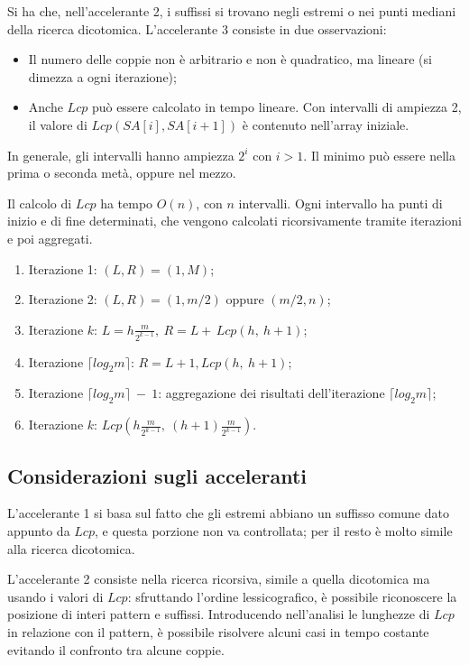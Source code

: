 Si ha che, nell'accelerante 2, i suffissi si trovano negli estremi o nei punti mediani della ricerca dicotomica. L'accelerante 3 consiste in due osservazioni:
\begin{itemize}
	\item Il numero delle coppie non è arbitrario e non è quadratico, ma lineare (si dimezza a ogni iterazione);
	 \item Anche $Lcp$ può essere calcolato in tempo lineare. Con intervalli di ampiezza 2, il valore di $Lcp(SA[i], SA[i+1])$ è contenuto nell'array iniziale.
\end{itemize}
In generale, gli intervalli hanno ampiezza $2^i$ con $i > 1$. Il minimo può essere nella prima o seconda metà, oppure nel mezzo.

Il calcolo di $Lcp$ ha tempo $O(n)$, con $n$ intervalli. Ogni intervallo ha punti di inizio e di fine determinati, che vengono calcolati ricorsivamente tramite iterazioni e poi aggregati.
\begin{enumerate}
	\item Iterazione 1: $(L, R) = (1, M)$;
	\item Iterazione 2: $(L, R) = (1, m/2)$ oppure $(m/2, n)$;
	\item Iterazione $k$: $L = h\frac{m}{2^{k-1}},\ R = L + \, Lcp(h,\ h + 1)$;
	\item Iterazione $\lceil log_2m\rceil$: $R = L + 1, Lcp(h,\ h + 1)$;
	\item Iterazione $\lceil log_2m\rceil\:-\:1$: aggregazione dei risultati dell'iterazione $\lceil log_2m\rceil$;
	\item Iterazione $k$: $Lcp(h\frac{m}{2^{k-1}},\ (h + 1)\frac{m}{2^{k-1}})$.
\end{enumerate}

\newpage
\subsection{Considerazioni sugli acceleranti}
L'accelerante 1 si basa sul fatto che gli estremi abbiano un suffisso comune dato appunto da $Lcp$, e questa porzione non va controllata; per il resto è molto simile alla ricerca dicotomica.

L'accelerante 2 consiste nella ricerca ricorsiva, simile a quella dicotomica ma usando i valori di $Lcp$: sfruttando l'ordine lessicografico, è possibile riconoscere la posizione di interi pattern e suffissi. Introducendo nell'analisi le lunghezze di $Lcp$ in relazione con il pattern, è possibile risolvere alcuni casi in tempo costante evitando il confronto tra alcune coppie.

